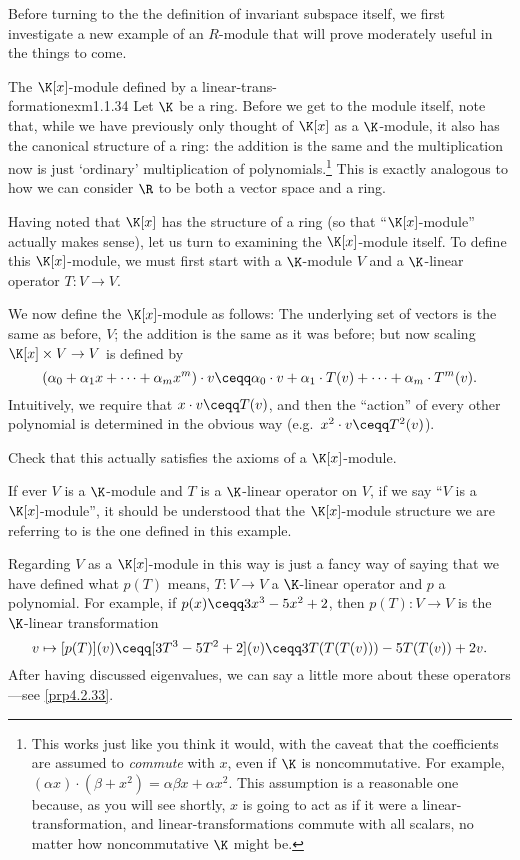 Before turning to the the definition of invariant subspace itself, we first investigate a new example of an $R$-module that will prove moderately useful in the things to come.
\begin{exm}{The $\K [x]$-module defined by a linear-trans-\\formation}{exm1.1.34}
	Let $\K$ be a ring.  Before we get to the module itself, note that, while we have previously only thought of $\K [x]$ as a $\K$-module, it also has the canonical structure of a ring:  the addition is the same and the multiplication now is just `ordinary' multiplication of polynomials.\footnote{This works just like you think it would, with the caveat that the coefficients are assumed to \emph{commute} with $x$, even if $\K$ is noncommutative.  For example, $(\alpha x)\cdot (\beta +x^2)=\alpha \beta x+\alpha x^2$.  This assumption is a reasonable one because, as you will see shortly, $x$ is going to act as if it were a linear-transformation, and linear-transformations commute with all scalars, no matter how noncommutative $\K$ might be.}  This is exactly analogous to how we can consider $\R$ to be both a vector space and a ring.
	
	Having noted that $\K [x]$ has the structure of a ring (so that ``$\K [x]$-module'' actually makes sense), let us turn to examining the $\K [x]$-module itself.  To define this $\K [x]$-module, we must first start with a $\K$-module $V$ and a $\K$-linear operator $T\colon V\rightarrow V$.
	
	We now define the $\K [x]$-module as follows:  The underlying set of vectors is the same as before, $V$; the addition is the same as it was before; but now scaling $\K [x]\times V\rightarrow V$ is defined by
	\begin{equation}
	(\alpha _0+\alpha _1x+\cdots +\alpha _mx^m)\cdot v\ceqq \alpha _0\cdot v+\alpha _1\cdot T(v)+\cdots +\alpha _m\cdot T^m(v).
	\end{equation}
	Intuitively, we require that $x\cdot v\ceqq T(v)$, and then the ``action'' of every other polynomial is determined in the obvious way (e.g.~$x^2\cdot v\ceqq T^2(v)$).
	\begin{exr}[breakable=false]{}{}
		Check that this actually satisfies the axioms of a $\K [x]$-module.
	\end{exr}
	\begin{rmk}
		If ever $V$ is a $\K$-module and $T$ is a $\K$-linear operator on $V$, if we say ``$V$ is a $\K [x]$-module'', it should be understood that the $\K [x]$-module structure we are referring to is the one defined in this example.
	\end{rmk}
\end{exm}
Regarding $V$ as a $\K [x]$-module in this way is just a fancy way of saying that we have defined what $p(T)$ means, $T\colon V\rightarrow V$ a $\K$-linear operator and $p$ a polynomial.  For example, if $p(x)\ceqq 3x^3-5x^2+2$, then $p(T)\colon V\rightarrow V$ is the $\K$-linear transformation
\begin{equation}
v\mapsto [p(T)](v)\ceqq [3T^3-5T^2+2](v)\ceqq 3T(T(T(v)))-5T(T(v))+2v.
\end{equation}
After having discussed eigenvalues, we can say a little more about these operators---see \cref{prp4.2.33}.

